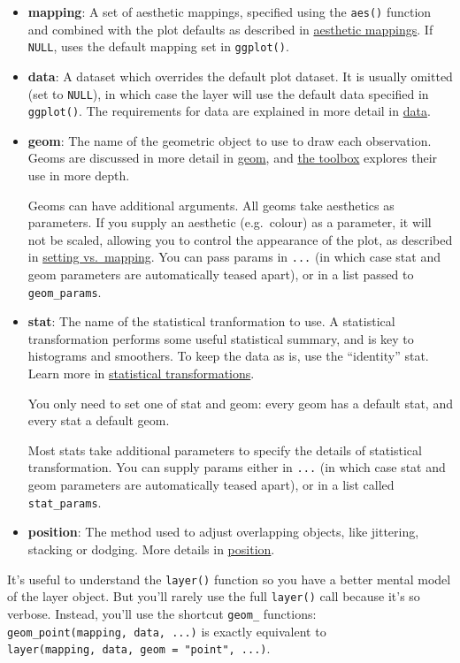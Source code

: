 \begin{itemize}
\item
  \textbf{mapping}: A set of aesthetic mappings, specified using the
  \texttt{aes()} function and combined with the plot defaults as
  described in \hyperref[sec:aes]{aesthetic mappings}. If \texttt{NULL},
  uses the default mapping set in \texttt{ggplot()}.
\item
  \textbf{data}: A dataset which overrides the default plot dataset. It
  is usually omitted (set to \texttt{NULL}), in which case the layer
  will use the default data specified in \texttt{ggplot()}. The
  requirements for data are explained in more detail in
  \hyperref[sec:data]{data}.
\item
  \textbf{geom}: The name of the geometric object to use to draw each
  observation. Geoms are discussed in more detail in
  \hyperref[sec:data]{geom}, and \hyperref[cha:toolbox]{the toolbox}
  explores their use in more depth.

  Geoms can have additional arguments. All geoms take aesthetics as
  parameters. If you supply an aesthetic (e.g.~colour) as a parameter,
  it will not be scaled, allowing you to control the appearance of the
  plot, as described in \hyperref[sub:setting-mapping]{setting
  vs.~mapping}. You can pass params in \texttt{...} (in which case stat
  and geom parameters are automatically teased apart), or in a list
  passed to \texttt{geom\_params}.
\item
  \textbf{stat}: The name of the statistical tranformation to use. A
  statistical transformation performs some useful statistical summary,
  and is key to histograms and smoothers. To keep the data as is, use
  the ``identity'' stat. Learn more in \hyperref[sec:stat]{statistical
  transformations}.

  You only need to set one of stat and geom: every geom has a default
  stat, and every stat a default geom.

  Most stats take additional parameters to specify the details of
  statistical transformation. You can supply params either in
  \texttt{...} (in which case stat and geom parameters are automatically
  teased apart), or in a list called \texttt{stat\_params}.
\item
  \textbf{position}: The method used to adjust overlapping objects, like
  jittering, stacking or dodging. More details in
  \hyperref[sec:position]{position}.
\end{itemize}

It's useful to understand the \texttt{layer()} function so you have a
better mental model of the layer object. But you'll rarely use the full
\texttt{layer()} call because it's so verbose. Instead, you'll use the
shortcut \texttt{geom\_} functions:
\texttt{geom\_point(mapping,\ data,\ ...)} is exactly equivalent to
\texttt{layer(mapping,\ data,\ geom\ =\ "point",\ ...)}.

